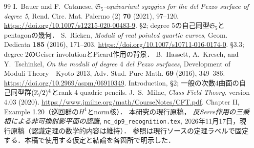 \documentclass[11pt,a4paper]{ltjsarticle}
\begin{document}
\begin{thebibliography}{99}
 I.~Bauer and F.~Catanese,
\emph{$\mathfrak S_5$-equivariant syzygies for the del Pezzo surface of degree 5},
Rend. Circ. Mat. Palermo (2) \textbf{70} (2021), 97--120.
\url{https://doi.org/10.1007/s12215-020-00483-9}.
\S2; degree $5$の自己同型$\mathfrak S_5$とpentagonの幾何．
 S.~Rieken,
\emph{Moduli of real pointed quartic curves},
Geom. Dedicata \textbf{185} (2016), 171--203.
\url{https://doi.org/10.1007/s10711-016-0174-0}.
\S3.3; degree $2$のGeiser involutionとPicard作用の背景．
 B.~Hassett, A.~Kresch, and Y.~Tschinkel,
\emph{On the moduli of degree $4$ del Pezzo surfaces},
Development of Moduli Theory---Kyoto 2013,
Adv. Stud. Pure Math. \textbf{69} (2016), 349--386.
\url{https://doi.org/10.2969/aspm/06910349}.
Introduction, \S2; 一般の次数4曲面の自己同型群$(\mathbb Z/2)^4$とrank $4$ quadric pencils.
 J.~S.~Milne,
\emph{Class Field Theory}, version 4.03 (2020).
\url{https://www.jmilne.org/math/CourseNotes/CFT.pdf}.
Chapter II, Example 1.20（巡回群の$H^1$とnorm核）．
 本研究の現行原稿，
\emph{反Serre作用の三乗根による非可換射影平面の認識},
\texttt{nc\_dp9\_recognition.tex}, 2026年11月17日，現行原稿（認識定理の数学的内容は維持）．
参照は現行ソースの定理ラベルで固定する．本稿で使用する仮定と結論を各箇所で明示した．
\end{thebibliography}
\endgroup
\end{document}
